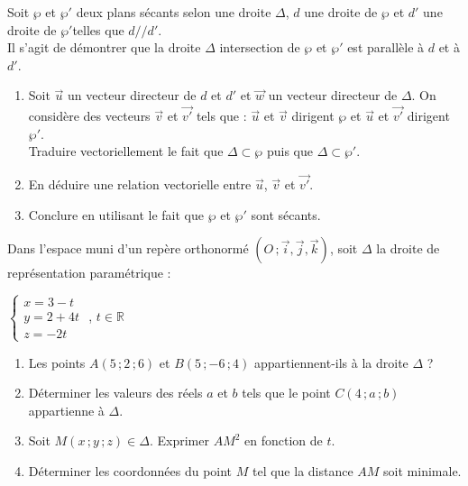 \begin{colonne*exercice}
\begin{exercice}
    Soit $\wp$ et $\wp'$ deux plans sécants selon une droite $\Delta$,
    $d$ une droite de $\wp$ et $d'$ une droite de $\wp'$telles que
    $d//d'$.  \\ Il s'agit de démontrer que la droite $\Delta$
    intersection de $\wp$ et $\wp'$ est parallèle à $d$ et à $d'$.
    \begin{enumerate}
    \item Soit $\vec{u}$ un vecteur directeur de $d$ et $d'$ et
      $\vec{w}$ un vecteur directeur de $\Delta$.  On considère des
      vecteurs $\vec{v}$ et $\vec{v'}$ tels que : $\vec{u}$ et
      $\vec{v}$ dirigent $\wp$ et
      $\vec{u}$ et $\vec{v'}$ dirigent $\wp'$.\\
      Traduire vectoriellement le fait que $\Delta\subset\wp$ puis que
      $\Delta\subset\wp'$.
    \item En déduire une relation vectorielle entre $\vec{u}$,
      $\vec{v}$ et $\vec{v'}$.
    \item Conclure en utilisant le fait que $\wp$ et $\wp'$ sont
      sécants.
    \end{enumerate}
  \end{exercice}

  \begin{exercice}
    Dans l'espace muni d'un repère orthonormé
    $(O\,; \vec{i},\vec{j},\vec{k})$, soit $\Delta$ la droite de
    représentation paramétrique :

    \begin{center}
      $\begin{cases}x=3-t \\y=2+4t \\z=-2t \end{cases}$ ,
      $t\in\mathbb{R}$
    \end{center}

    \begin{enumerate}
    \item Les points $A(5\,;2\,;6)$ et $B(5\,;-6\,;4)$
      appartiennent-ils à la droite $\Delta$ ?
    \item Déterminer les valeurs des réels $a$ et $b$ tels que le
      point $C(4\,;a\,;b)$ appartienne à $\Delta$.
    \item Soit $M(x\,;y\,;z)\in \Delta$. Exprimer $AM^2$ en fonction
      de $t$.
    \item Déterminer les coordonnées du point $M$ tel que la distance
      $AM$ soit minimale.
    \end{enumerate}
  \end{exercice}


\end{colonne*exercice}
